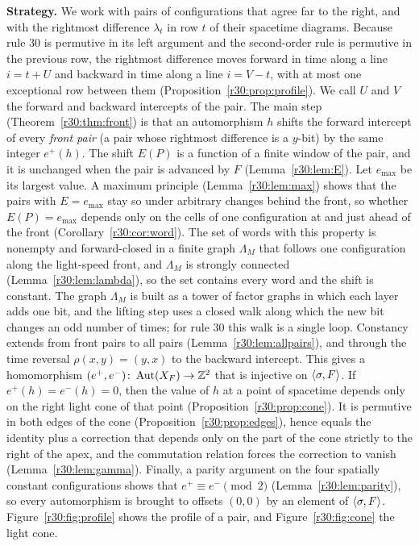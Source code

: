 \medskip
\noindent\textbf{Strategy.} We work with pairs of configurations that agree far to the right, and with the rightmost difference $\lambda_t$ in row $t$ of their spacetime diagrams. Because rule $30$ is permutive in its left argument and the second-order rule is permutive in the previous row, the rightmost difference moves forward in time along a line $i=t+U$ and backward in time along a line $i=V-t$, with at most one exceptional row between them (Proposition~\ref{r30:prop:profile}). We call $U$ and $V$ the forward and backward intercepts of the pair. The main step (Theorem~\ref{r30:thm:front}) is that an automorphism $h$ shifts the forward intercept of every \emph{front pair} (a pair whose rightmost difference is a $y$-bit) by the same integer $e^+(h)$. The shift $E(P)$ is a function of a finite window of the pair, and it is unchanged when the pair is advanced by $F$ (Lemma~\ref{r30:lem:E}). Let $e_{\max}$ be its largest value. A maximum principle (Lemma~\ref{r30:lem:max}) shows that the pairs with $E=e_{\max}$ stay so under arbitrary changes behind the front, so whether $E(P)=e_{\max}$ depends only on the cells of one configuration at and just ahead of the front (Corollary~\ref{r30:cor:word}). The set of words with this property is nonempty and forward-closed in a finite graph $\Lambda_M$ that follows one configuration along the light-speed front, and $\Lambda_M$ is strongly connected (Lemma~\ref{r30:lem:lambda}), so the set contains every word and the shift is constant. The graph $\Lambda_M$ is built as a tower of factor graphs in which each layer adds one bit, and the lifting step uses a closed walk along which the new bit changes an odd number of times; for rule $30$ this walk is a single loop. Constancy extends from front pairs to all pairs (Lemma~\ref{r30:lem:allpairs}), and through the time reversal $\rho(x,y)=(y,x)$ to the backward intercept. This gives a homomorphism $(e^+,e^-)\colon\operatorname{Aut}(X_F)\to\mathbb{Z}^2$ that is injective on $\langle\sigma,F\rangle$. If $e^+(h)=e^-(h)=0$, then the value of $h$ at a point of spacetime depends only on the right light cone of that point (Proposition~\ref{r30:prop:cone}). It is permutive in both edges of the cone (Proposition~\ref{r30:prop:edges}), hence equals the identity plus a correction that depends only on the part of the cone strictly to the right of the apex, and the commutation relation forces the correction to vanish (Lemma~\ref{r30:lem:gamma}). Finally, a parity argument on the four spatially constant configurations shows that $e^+\equiv e^-\pmod 2$ (Lemma~\ref{r30:lem:parity}), so every automorphism is brought to offsets $(0,0)$ by an element of $\langle\sigma,F\rangle$. Figure~\ref{r30:fig:profile} shows the profile of a pair, and Figure~\ref{r30:fig:cone} the light cone.

